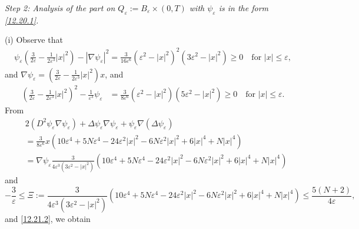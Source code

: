 \documentclass[11pt]{article}
\numberwithin{equation}{section}
\def\e{\varepsilon}
\begin{document}
{\it Step 2: Analysis of  the part on $Q_\e:=B_\e\times(0,T)$ with  $\psi_\e$ is in the form \eqref{12.20.1}.}

 (i) Observe that
\begin{equation}\label{12.20.2}
\begin{split}
\psi_\varepsilon\left(\frac{3}{2\varepsilon}-\frac{1}{2\varepsilon^3}|x|^2\right)-|\nabla \psi_\varepsilon|^2=\frac{3}{16\varepsilon^6}(\varepsilon^2-|x|^2)^2(3\varepsilon^2-|x|^2)\geq 0 \quad \text{for }|x|\leq \varepsilon,
\end{split}
\end{equation}
and $\nabla\psi_\varepsilon=\left(\frac{3}{2\varepsilon}-\frac{1}{2\varepsilon^3}|x|^2\right)x$, and
\begin{equation}\label{12.20.3}
\begin{split}
\left(\frac{3}{2\varepsilon}-\frac{1}{2\varepsilon^3}|x|^2\right)^2-\frac{1}{\varepsilon^3}\psi_\varepsilon
&=\frac{3}{8\varepsilon^6}(\varepsilon^2-|x|^2)(5\varepsilon^2-|x|^2)\geq 0 \quad \text{for }|x|\leq \varepsilon.
\end{split}
\end{equation}
From
\begin{equation*}
\begin{split}
&2(D^2\psi_\varepsilon\nabla \psi_\varepsilon)+\Delta\psi_\varepsilon \nabla \psi_\varepsilon+\psi_\varepsilon\nabla (\Delta \psi_\varepsilon)\\
&=\frac{3}{8\varepsilon^6}x\left(10\varepsilon^4+5N\varepsilon^4-24\varepsilon^2|x|^2-6N\varepsilon^2|x|^2+6|x|^4+N|x|^4\right) \\
&=\nabla\psi_\varepsilon \frac{3}{4\varepsilon^3(3\varepsilon^2-|x|^2)}\left(10\varepsilon^4+5N\varepsilon^4-24\varepsilon^2|x|^2-6N\varepsilon^2|x|^2+6|x|^4+N|x|^4\right)
\end{split}
\end{equation*}
and
\begin{equation*}
-\frac{3}{\varepsilon}\leq \Xi:= \frac{3}{4\varepsilon^3(3\varepsilon^2-|x|^2)}\left(10\varepsilon^4+5N\varepsilon^4-24\varepsilon^2|x|^2-6N\varepsilon^2|x|^2+6|x|^4+N|x|^4\right)\leq \frac{5(N+2)}{4\varepsilon},
\end{equation*}
and \eqref{12.21.2}, we obtain
\end{document}
